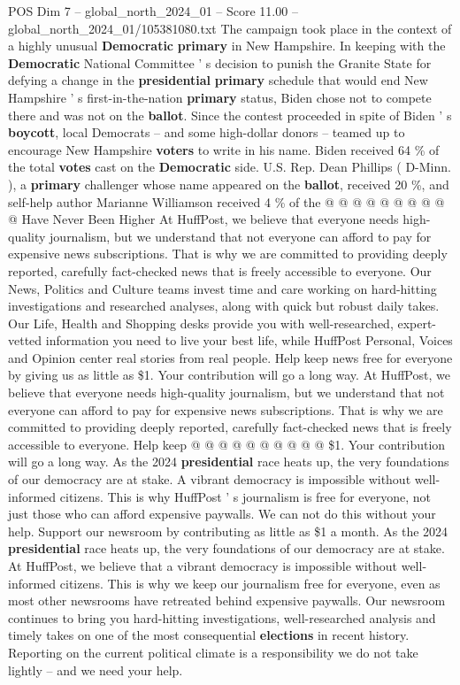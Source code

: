 \begin{textsample}{POS Dim 7 – global\_north\_2024\_01 – Score 11.00 – global\_north\_2024\_01/105381080.txt}
The campaign took place in the context of a highly unusual \textbf{Democratic} \textbf{primary} in New Hampshire.
In keeping with the \textbf{Democratic} National Committee ' s decision to punish the Granite State for defying a change in the \textbf{presidential} \textbf{primary} schedule that would end New Hampshire ' s first-in-the-nation \textbf{primary} status, Biden chose not to compete there and was not on the \textbf{ballot}.
Since the contest proceeded in spite of Biden ' s \textbf{boycott}, local Democrats -- and some high-dollar donors -- teamed up to encourage New Hampshire \textbf{voters} to write in his name.
Biden received 64 \% of the total \textbf{votes} cast on the \textbf{Democratic} side.
U.S.
Rep.
Dean Phillips ( D-Minn. ), a \textbf{primary} challenger whose name appeared on the \textbf{ballot}, received 20 \%, and self-help author Marianne Williamson received 4 \% of the @ @ @ @ @ @ @ @ @ @ Have Never Been Higher At HuffPost, we believe that everyone needs high-quality journalism, but we understand that not everyone can afford to pay for expensive news subscriptions.
That is why we are committed to providing deeply reported, carefully fact-checked news that is freely accessible to everyone.
Our News, Politics and Culture teams invest time and care working on hard-hitting investigations and researched analyses, along with quick but robust daily takes.
Our Life, Health and Shopping desks provide you with well-researched, expert-vetted information you need to live your best life, while HuffPost Personal, Voices and Opinion center real stories from real people.
Help keep news free for everyone by giving us as little as \$1.
Your contribution will go a long way.
At HuffPost, we believe that everyone needs high-quality journalism, but we understand that not everyone can afford to pay for expensive news subscriptions.
That is why we are committed to providing deeply reported, carefully fact-checked news that is freely accessible to everyone.
Help keep @ @ @ @ @ @ @ @ @ @ \$1.
Your contribution will go a long way.
As the 2024 \textbf{presidential} race heats up, the very foundations of our democracy are at stake.
A vibrant democracy is impossible without well-informed citizens.
This is why HuffPost ' s journalism is free for everyone, not just those who can afford expensive paywalls.
We can not do this without your help.
Support our newsroom by contributing as little as \$1 a month.
As the 2024 \textbf{presidential} race heats up, the very foundations of our democracy are at stake.
At HuffPost, we believe that a vibrant democracy is impossible without well-informed citizens.
This is why we keep our journalism free for everyone, even as most other newsrooms have retreated behind expensive paywalls.
Our newsroom continues to bring you hard-hitting investigations, well-researched analysis and timely takes on one of the most consequential \textbf{elections} in recent history.
Reporting on the current political climate is a responsibility we do not take lightly -- and we need your help.

\end{textsample}
